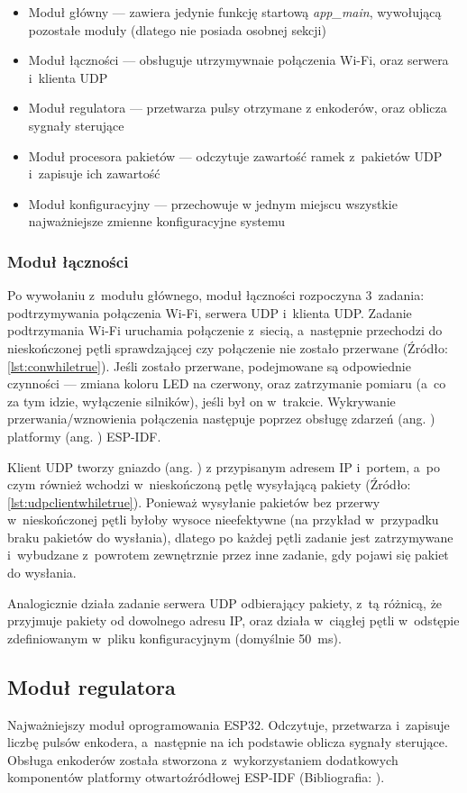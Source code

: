 \begin{itemize}
  \item Moduł główny --- zawiera jedynie funkcję startową \textit{app{\_}main}, wywołującą pozostałe moduły (dlatego nie posiada osobnej sekcji)
  \item Moduł łączności --- obsługuje utrzymywnaie połączenia Wi-Fi, oraz serwera i~klienta UDP
  \item Moduł regulatora --- przetwarza pulsy otrzymane z enkoderów, oraz oblicza sygnały sterujące
  \item Moduł procesora pakietów --- odczytuje zawartość ramek z~pakietów UDP i~zapisuje ich zawartość
  \item Moduł konfiguracyjny --- przechowuje w jednym miejscu wszystkie najważniejsze zmienne konfiguracyjne systemu
\end{itemize}

\subsubsection*{Moduł łączności}
Po wywołaniu z~modułu głównego, moduł łączności rozpoczyna 3~zadania: podtrzymywania połączenia Wi-Fi, serwera UDP i~klienta UDP. Zadanie podtrzymania Wi-Fi uruchamia połączenie z~siecią, a~następnie przechodzi do nieskończonej pętli sprawdzającej czy połączenie nie zostało przerwane (Źródło: \ref{lst:conwhiletrue}). Jeśli zostało przerwane, podejmowane są odpowiednie czynności --- zmiana koloru LED na czerwony, oraz zatrzymanie pomiaru (a~co za tym idzie, wyłączenie silników), jeśli był on w~trakcie. Wykrywanie przerwania/wznowienia połączenia następuje poprzez obsługę zdarzeń (ang. ) platformy (ang. ) ESP-IDF.

Klient UDP tworzy gniazdo (ang. ) z przypisanym adresem IP i~portem, a~po czym również wchodzi w~nieskończoną pętlę wysyłającą pakiety (Źródło: \ref{lst:udpclientwhiletrue}). Ponieważ wysyłanie pakietów bez przerwy w~nieskończonej pętli byłoby wysoce nieefektywne (na przykład w~przypadku braku pakietów do wysłania), dlatego po każdej pętli zadanie jest zatrzymywane i~wybudzane z~powrotem zewnętrznie przez inne zadanie, gdy pojawi się pakiet do wysłania.

Analogicznie działa zadanie serwera UDP odbierający pakiety, z~tą różnicą, że przyjmuje pakiety od dowolnego adresu IP, oraz działa w~ciągłej pętli w~odstępie zdefiniowanym w~pliku konfiguracyjnym (domyślnie 50~ms).

\subsection*{Moduł regulatora}
Najważniejszy moduł oprogramowania ESP32. Odczytuje, przetwarza i~zapisuje liczbę pulsów enkodera, a~następnie na ich podstawie oblicza sygnały sterujące. Obsługa enkoderów została stworzona z~wykorzystaniem dodatkowych komponentów platformy otwartoźródłowej ESP-IDF (Bibliografia: \cite{bib:espidfcomponents}).

